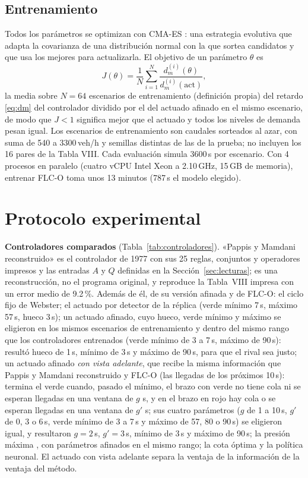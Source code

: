 \documentclass[journal]{IEEEtran}
\newcommand{\FLC}{FLC-O}
\newcommand{\PMR}{Pappis y Mamdani reconstruido}
\begin{document}
\subsection{Entrenamiento}
\label{sec:entrena}
Todos los parámetros se optimizan con CMA-ES \cite{Hansen2001,Hansen2016}: una estrategia evolutiva que adapta la covarianza de una distribución normal con la que sortea candidatos y que usa los mejores para actualizarla. El objetivo de un parámetro $\theta$ es
\begin{equation}
J(\theta)=\frac{1}{N}\sum_{i=1}^{N}\frac{d_m^{(i)}(\theta)}{d_m^{(i)}(\text{act})},
\label{eq:objetivo}
\end{equation}
la media sobre $N=64$ escenarios de entrenamiento (definición propia) del retardo \eqref{eq:dm} del controlador dividido por el del actuado afinado en el mismo escenario, de modo que $J<1$ significa mejor que el actuado y todos los niveles de demanda pesan igual. Los escenarios de entrenamiento son caudales sorteados al azar, con suma de 540 a 3300\,veh/h y semillas distintas de las de la prueba; no incluyen los 16 pares de la Tabla VIII. Cada evaluación simula 3600\,s por escenario. Con 4 procesos en paralelo (cuatro vCPU Intel Xeon a 2.10\,GHz, 15\,GB de memoria), entrenar \FLC{} toma unos 13 minutos (787\,s el modelo elegido).

\section{Protocolo experimental}
\label{sec:protocolo}

\textbf{Controladores comparados} (Tabla~\ref{tab:controladores}). «\PMR{}» es el controlador de 1977 con sus 25 reglas, conjuntos y operadores impresos y las entradas $A$ y $Q$ definidas en la Sección~\ref{sec:lecturas}; es una reconstrucción, no el programa original, y reproduce la Tabla~VIII impresa con un error medio de 9.2\,\%. Además de él, de su versión afinada y de \FLC{}: el ciclo fijo de Webster; el actuado por detector de la réplica (verde mínimo 7\,s, máximo 57\,s, hueco 3\,s); un actuado afinado, cuyo hueco, verde mínimo y máximo se eligieron en los mismos escenarios de entrenamiento y dentro del mismo rango que los controladores entrenados (verde mínimo de 3 a 7\,s, máximo de 90\,s): resultó hueco de 1\,s, mínimo de 3\,s y máximo de 90\,s, para que el rival sea justo; un actuado afinado \emph{con vista adelante}, que recibe la misma información que \PMR{} y \FLC{} (las llegadas de los próximos 10\,s): termina el verde cuando, pasado el mínimo, el brazo con verde no tiene cola ni se esperan llegadas en una ventana de $g$ s, y en el brazo en rojo hay cola o se esperan llegadas en una ventana de $g'$ s; sus cuatro parámetros ($g$ de 1 a 10\,s, $g'$ de 0, 3 o 6\,s, verde mínimo de 3 a 7\,s y máximo de 57, 80 o 90\,s) se eligieron igual, y resultaron $g=2$\,s, $g'=3$\,s, mínimo de 3\,s y máximo de 90\,s; la presión máxima \cite{Varaiya2013}, con parámetros afinados en el mismo rango; la cota óptima y la política neuronal. El actuado con vista adelante separa la ventaja de la información de la ventaja del método.
\end{document}
